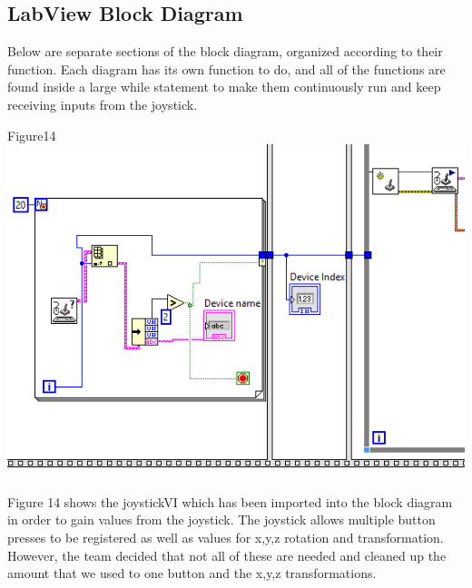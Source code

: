 \documentclass{article}
\begin{document}
\subsection{LabView Block Diagram}
Below are separate sections of the block diagram, organized according to their function. Each diagram has its own function to do, and all of the functions are found inside a large while statement to make them continuously run and keep receiving inputs from the joystick. 

\begin{center}{Figure14 \includegraphics[]{JoystickVI.png}}\end{center}
Figure 14 shows the joystickVI which has been imported into the block diagram in order to gain values from the joystick. The joystick allows multiple button presses to be registered as well as values for x,y,z rotation and transformation. However, the team decided that not all of these are needed and cleaned up the amount that we used to one button and the x,y,z transformations. 
\end{document}

